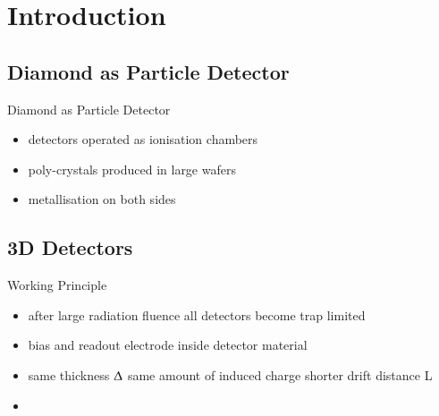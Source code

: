 \section{Introduction}
\subsection{Diamond as Particle Detector}
\begin{frame}{Diamond as Particle Detector}

	
	\begin{itemize}\itemfill
		\item detectors operated as ionisation chambers 
		\item poly-crystals produced in large wafers
		\item metallisation on both sides
	\end{itemize}

\end{frame}

\subsection{3D Detectors}
\begin{frame}{Working Principle}

	\vspace*{-10pt}\vspace*{-10pt}
	
	\begin{itemize}\itemfill
		\item after large radiation fluence all detectors become trap limited
		\item bias and readout electrode inside detector material
		\item same thickness $\Updelta$ \ra same amount of induced charge \ra shorter drift distance L
		\item {}
	\end{itemize}

\end{frame}

